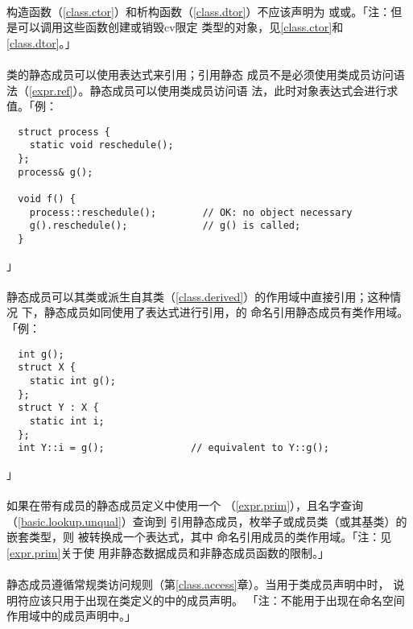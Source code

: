 \paragraph{}
构造函数（\ref{class.ctor}）和析构函数（\ref{class.dtor}）不应该声明为
或或。「注：但是可以调用这些函数创建或销毁cv限定
类型的对象，见\ref{class.ctor}和\ref{class.dtor}。」

\paragraph{}
类的静态成员可以使用表达式来引用；引用静态
成员不是必须使用类成员访问语法（\ref{expr.ref}）。静态成员可以使用类成员访问语
法，此时对象表达式会进行求值。「例：
\begin{lstlisting}
  struct process {
    static void reschedule();
  };
  process& g();

  void f() {
    process::reschedule();        // OK: no object necessary
    g().reschedule();             // g() is called;
  }
\end{lstlisting}」

\paragraph{}
静态成员可以其类或派生自其类（\ref{class.derived}）的作用域中直接引用；这种情况
下，静态成员如同使用了表达式进行引用，的
命名引用静态成员有类作用域。「例：
\begin{lstlisting}
  int g();
  struct X {
    static int g();
  };
  struct Y : X {
    static int i;
  };
  int Y::i = g();               // equivalent to Y::g();
\end{lstlisting}」

\paragraph{}
如果在带有成员的静态成员定义中使用一个
（\ref{expr.prim}），且名字查询（\ref{basic.lookup.unqual}）查询到
引用静态成员，枚举子或成员类（或其基类）的嵌套类型，则
被转换成一个表达式，其中
命名引用成员的类作用域。「注：见\ref{expr.prim}关于使
用非静态数据成员和非静态成员函数的限制。」

\paragraph{}
静态成员遵循常规类访问规则（第\ref{class.access}章）。当用于类成员声明中时，
说明符应该只用于出现在类定义的中的成员声明。
「注：不能用于出现在命名空间作用域中的成员声明中。」

